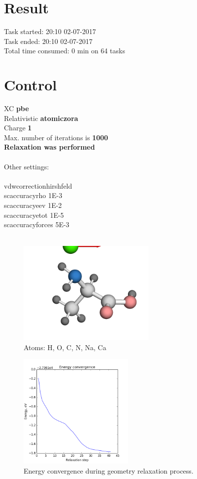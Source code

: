 \documentclass[12pt,a4paper,twocolumn]{report}
\begin{document}
\section*{Result}
Task started: \hfill 20:10 02-07-2017
\\
Task ended: \hfill 20:10 02-07-2017
\\
Total time consumed: 0 min on 64 tasks\\
\section*{Control}
XC  \hfill \textbf{pbe}\\
Relativistic  \hfill \textbf{atomic\textunderscore zora}\\
Charge  \hfill \textbf{1}\\
Max. number of iterations is \hfill \textbf{1000}\\
\textbf{Relaxation was performed\\}
\\
Other settings:\\
\\
vdw\textunderscore correction\textunderscore hirshfeld\\
sc\textunderscore accuracy\textunderscore rho    1E-3\\
sc\textunderscore accuracy\textunderscore eev    1E-2\\
sc\textunderscore accuracy\textunderscore etot   1E-5\\
sc\textunderscore accuracy\textunderscore forces 5E-3\\
\\
\newpage
\begin{figure}[h!]
\caption{Atoms: H, O, C, N, Na, Ca } 
\includegraphics[width=0.6\textwidth]{geometry.png}
\end{figure}
\begin{figure}[H]
\caption{Energy convergence during geometry relaxation process.} 
\includegraphics[width=0.5\textwidth]{energy_convergence.png}
\end{figure}
\end{document}

